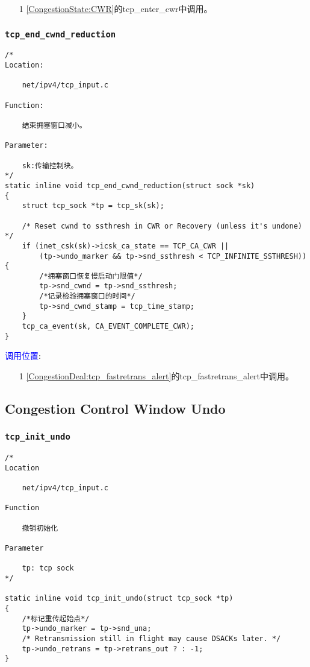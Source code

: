             \begin{enumerate}
                \item[1]        \ref{CongestionState:CWR}的tcp\_enter\_cwr中调用。
            \end{enumerate}

        \subsubsection{\texttt{tcp_end_cwnd_reduction}}
            \label{CongestionControlWindow:tcp_end_cwnd_reduction}
\begin{verbatim}
/* 
Location:

    net/ipv4/tcp_input.c

Function:

    结束拥塞窗口减小。

Parameter:

    sk:传输控制块。
*/
static inline void tcp_end_cwnd_reduction(struct sock *sk)
{
    struct tcp_sock *tp = tcp_sk(sk);

    /* Reset cwnd to ssthresh in CWR or Recovery (unless it's undone) */
    if (inet_csk(sk)->icsk_ca_state == TCP_CA_CWR ||
        (tp->undo_marker && tp->snd_ssthresh < TCP_INFINITE_SSTHRESH)) {
        /*拥塞窗口恢复慢启动门限值*/
        tp->snd_cwnd = tp->snd_ssthresh;
        /*记录检验拥塞窗口的时间*/
        tp->snd_cwnd_stamp = tcp_time_stamp;
    }
    tcp_ca_event(sk, CA_EVENT_COMPLETE_CWR);
}
\end{verbatim}

        \textcolor{blue}{调用位置}:

            \begin{enumerate}
                \item[1]        \ref{CongestionDeal:tcp_fastretrans_alert}的tcp\_fastretrans\_alert中调用。
            \end{enumerate}

    \subsection{Congestion Control Window Undo}
        \subsubsection{\texttt{tcp_init_undo}}
            \label{CongestionControlWindowUndo:tcp_init_undo}
\begin{verbatim}
/*
Location

    net/ipv4/tcp_input.c

Function

    撤销初始化

Parameter

    tp: tcp sock
*/

static inline void tcp_init_undo(struct tcp_sock *tp)
{
    /*标记重传起始点*/
    tp->undo_marker = tp->snd_una;
    /* Retransmission still in flight may cause DSACKs later. */
    tp->undo_retrans = tp->retrans_out ? : -1;
}
\end{verbatim}

